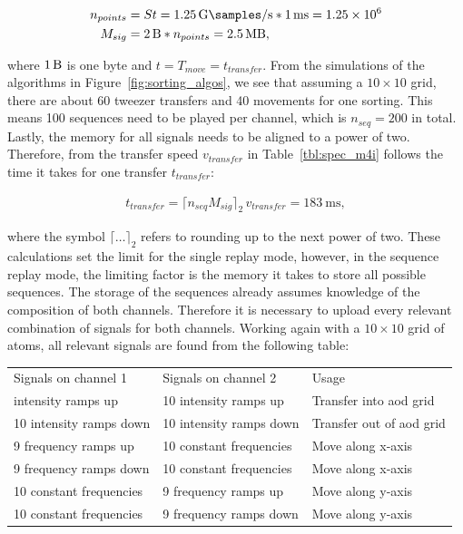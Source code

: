 \begin{align}
	n_{points} &= S t = \SI{1.25}{\giga\samples\per\second} * \SI{1}{\milli\second} = \num{1.25e6} \\
	M_{sig} &= \SI{2}{\byte} * n_{points} = \SI{2.5}{\mega\byte},
\end{align}

where $\SI{1}{\byte}$ is one byte and $t=T_{move}=t_{transfer}$. From the simulations of the algorithms in Figure~\ref{fig:sorting_algos}, we see that assuming a $10\times10$ grid, there are about 60 tweezer transfers and 40 movements for one sorting. This means 100 sequences need to be played per channel, which is $n_{seq}=200$ in total. Lastly, the memory for all signals needs to be aligned to a power of two. Therefore, from the transfer speed $v_{transfer}$ in Table~\ref{tbl:spec_m4i} follows the time it takes for one transfer $t_{transfer}$:

\begin{align}
	t_{transfer} = \lceil n_{seq} M_{sig}\rceil_2\, v_{transfer} = \SI{183}{\milli\second},
\end{align}

where the symbol $\lceil \ldots \rceil_2$ refers to rounding up to the next power of two.
These calculations set the limit for the single replay mode, however, in the sequence replay mode, the limiting factor is the memory it takes to store all possible sequences. The storage of the sequences already assumes knowledge of the composition of both channels. Therefore it is necessary to upload every relevant combination of signals for both channels. Working again with a $10\times10$ grid of atoms, all relevant signals are found from the following table:

\begin{table}[h!]%
\label{tbl:eom_crystals}
\centering
\begin{tabular}{l l l}
	\toprule \toprule
		Signals on channel 1 & Signals on channel 2 & Usage \\ \thickhline%
		10 intensity ramps up & 10 intensity ramps up & Transfer into \ac{aod} grid \\
		10 intensity ramps down & 10 intensity ramps down & Transfer out of \ac{aod} grid \\
		9 frequency ramps up & 10 constant frequencies & Move along x-axis \\
		9 frequency ramps down & 10 constant frequencies & Move along x-axis \\
		10 constant frequencies & 9 frequency ramps up & Move along y-axis \\
		10 constant frequencies & 9 frequency ramps down & Move along y-axis \\
	\bottomrule \bottomrule
\end{tabular}
\end{table}

